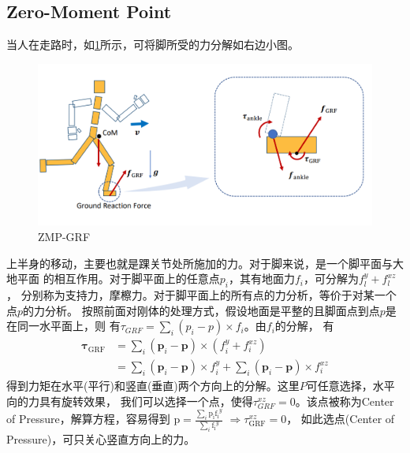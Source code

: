 \documentclass[lang=cn,newtx,10pt,scheme=chinese]{elegantbook}
\begin{document}
\subsection{Zero-Moment Point}
当人在走路时，如\ref{fig:ZMP-GRF}所示，可将脚所受的力分解如右边小图。
\begin{figure}[htbp]
  \centering
  \includegraphics[totalheight=1.6in]{"./image/ZMP-GRF.png"}
  \caption{ZMP-GRF} \label{fig:ZMP-GRF}
\end{figure}
上半身的移动，主要也就是踝关节处所施加的力。对于脚来说，是一个脚平面与大地平面
的相互作用。对于脚平面上的任意点$p_i$，其有地面力$f_i$，可分解为$f^y _l + f^{xz} _l$，
分别称为支持力，摩檫力。对于脚平面上的所有点的力分析，等价于对某一个点$p$的力分析。
按照前面对刚体的处理方式，假设地面是平整的且脚面点到点$p$是在同一水平面上，则
有$\tau_{GRF}=\sum_{i}(p_i - p)\times f_i$。由$f_i$的分解，
有
\begin{equation}
  \begin{aligned}
  \boldsymbol{\tau}_{\mathrm{GRF}} & =\sum_i\left(\boldsymbol{p}_i-\boldsymbol{p}\right) \times\left(f_i^y+f_i^{x z}\right) \\
  & =\sum_i\left(\boldsymbol{p}_i-\boldsymbol{p}\right) \times f_i^y+\sum_i\left(\boldsymbol{p}_i-\boldsymbol{p}\right) \times f_i^{x z}
  \end{aligned}
\end{equation}
得到力矩在水平(平行)和竖直(垂直)两个方向上的分解。这里$P$可任意选择，水平向的力具有旋转效果，
我们可以选择一个点，使得$\tau_{GRF}^{xz}=0$。该点被称为Center of Pressure，解算方程，容易得到
$\mathrm{p}=\frac{\sum_{i}\mathrm{p_i}\mathrm{f_i}^y}{\sum_{i}\mathrm{f_i}^y}$
$\Rightarrow \tau_{\mathrm{GRF}}^{xz}=0$，
如此选点(Center of Pressure)，可只关心竖直方向上的力。
\end{document}
